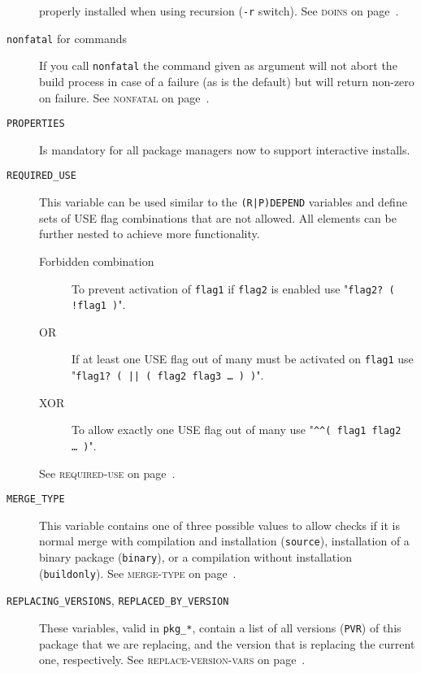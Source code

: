 \documentclass[a4paper]{leaflet}
\newcommand{\code}[1]{\texttt{#1}}
\newcommand{\featureref}[1]{\textsc{#1} on page~\pageref{feat:#1}}
\begin{document}
\begin{description}
    properly installed when using recursion (\code{-r} switch).
    See \featureref{doins}.
    \item[\code{nonfatal} for commands] If you call \code{nonfatal}
    the command given as argument will not abort the build process in
    case of a failure (as is the default) but will return non-zero on
    failure.
    See \featureref{nonfatal}.
    \item[\code{PROPERTIES}] Is mandatory for all package managers now
    to support interactive installs.
    \item[\code{REQUIRED\_USE}] This variable can be used similar to
    the \code{(R|P)DEPEND} variables and define sets of USE flag
    combinations that are not allowed.  All elements can be further
    nested to achieve more functionality.
    \begin{description}
        \item[Forbidden combination] To prevent activation of
        \code{flag1} if \code{flag2} is enabled use
        "\code{flag2? ( !flag1 )}".
        \item[OR] If at least one USE flag out of many must be
        activated on \code{flag1} use
        "\code{flag1? ( || ( flag2 flag3 \dots\ ) )}".
        \item[XOR] To allow exactly one USE flag out of many use
        "\code{\textasciicircum\textasciicircum ( flag1 flag2 \dots\ )}".
    \end{description}
    See \featureref{required-use}.
    \item[\code{MERGE\_TYPE}] This variable contains one of three
    possible values to allow checks if it is normal merge with
    compilation and installation (\code{source}), installation of a
    binary package (\code{binary}), or a compilation without
    installation (\code{buildonly}).  See \featureref{merge-type}.
    \item[\code{REPLACING\_VERSIONS}, \code{REPLACED\_BY\_VERSION}]
    These variables, valid in \code{pkg\_*}, contain a list of all
    versions (\code{PVR}) of this package that we are replacing, and
    the version that is replacing the current one, respectively.
    See \featureref{replace-version-vars}.
\end{description}
\end{document}
